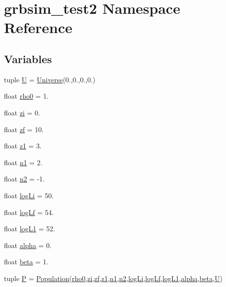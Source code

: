\hypertarget{namespacegrbsim__test2}{\section{grbsim\-\_\-test2 Namespace Reference}
\label{namespacegrbsim__test2}
}
\subsection*{Variables}
\begin{DoxyCompactItemize}
\item 
tuple \hyperlink{namespacegrbsim__test2_a833750999f6a6a533fa1953401f6f558}{U} = \hyperlink{classgrbsim_1_1_universe}{Universe}(0.,0.,0.,0.)
\item 
float \hyperlink{namespacegrbsim__test2_a05cb2b0d5b3df83de2b21ecf357c1f7a}{rho0} = 1.
\item 
float \hyperlink{namespacegrbsim__test2_a26f247fca7a995a7a7aa66713bf68ceb}{zi} = 0.
\item 
float \hyperlink{namespacegrbsim__test2_a29713267fce8abc775a28c327915dede}{zf} = 10.
\item 
float \hyperlink{namespacegrbsim__test2_aeb09b32704568d287377dcfa0a67db3c}{z1} = 3.
\item 
float \hyperlink{namespacegrbsim__test2_a4be2937624900a913f7611bf92990530}{n1} = 2.
\item 
float \hyperlink{namespacegrbsim__test2_a8b4865095db37b8e44a551be96abb247}{n2} = -\/1.
\item 
float \hyperlink{namespacegrbsim__test2_a9360a1849fdacc1c0d7254dd0cef2341}{log\-Li} = 50.
\item 
float \hyperlink{namespacegrbsim__test2_a519b592ed1ecd659e6798c090fff6322}{log\-Lf} = 54.
\item 
float \hyperlink{namespacegrbsim__test2_a75a20cb404a9721434baa76ac3268d29}{log\-L1} = 52.
\item 
float \hyperlink{namespacegrbsim__test2_afae8b761442f0621df6e5d2dc0952c2b}{alpha} = 0.
\item 
float \hyperlink{namespacegrbsim__test2_aab947809983f7713234bd51a3f89fa44}{beta} = 1.
\item 
tuple \hyperlink{namespacegrbsim__test2_ac5a4085bab1950b51a1ca1f9350faff3}{P} = \hyperlink{classgrbsim_1_1_population}{Population}(\hyperlink{namespacegrbsim__test2_a05cb2b0d5b3df83de2b21ecf357c1f7a}{rho0},\hyperlink{namespacegrbsim__test2_a26f247fca7a995a7a7aa66713bf68ceb}{zi},\hyperlink{namespacegrbsim__test2_a29713267fce8abc775a28c327915dede}{zf},\hyperlink{namespacegrbsim__test2_aeb09b32704568d287377dcfa0a67db3c}{z1},\hyperlink{namespacegrbsim__test2_a4be2937624900a913f7611bf92990530}{n1},\hyperlink{namespacegrbsim__test2_a8b4865095db37b8e44a551be96abb247}{n2},\hyperlink{namespacegrbsim__test2_a9360a1849fdacc1c0d7254dd0cef2341}{log\-Li},\hyperlink{namespacegrbsim__test2_a519b592ed1ecd659e6798c090fff6322}{log\-Lf},\hyperlink{namespacegrbsim__test2_a75a20cb404a9721434baa76ac3268d29}{log\-L1},\hyperlink{namespacegrbsim__test2_afae8b761442f0621df6e5d2dc0952c2b}{alpha},\hyperlink{namespacegrbsim__test2_aab947809983f7713234bd51a3f89fa44}{beta},\hyperlink{namespacegrbsim__test2_a833750999f6a6a533fa1953401f6f558}{U})

\end{DoxyCompactItemize}
